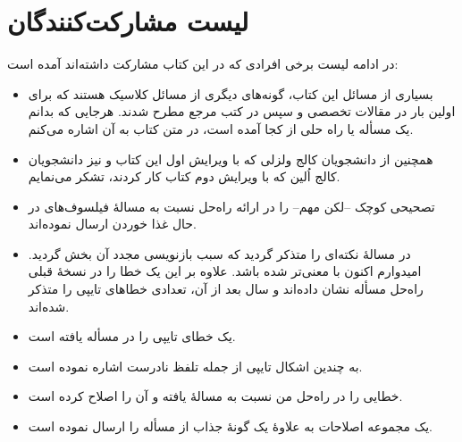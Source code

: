 \documentclass{book}
\begin{document}
\section*{لیست مشارکت‌کنندگان}

در ادامه لیست برخی افرادی که در این کتاب مشارکت داشته‌اند آمده است:

\begin{itemize}

\item    
    بسیاری از مسائل این کتاب، گونه‌های دیگری از مسائل کلاسیک هستند که برای اولین بار در مقالات تخصصی و سپس در کتب مرجع مطرح شدند. 
    هرجایی که بدانم یک مسأله یا راه حلی از کجا آمده است، در متن کتاب به آن اشاره می‌کنم.  

\item 
    همچنین از دانشجویان کالج ولزلی که با ویرایش اول این کتاب و نیز دانشجویان کالج اُلین
    که با ویرایش دوم کتاب  کار کردند، تشکر می‌نمایم. 

\item 
    تصحیحی کوچک --لکن مهم-- را در ارائه راه‌حل  نسبت به مسالهٔ فیلسوف‌های در حال غذا خوردن ارسال نموده‌اند.

\item {}
    در مسالهٔ  نکته‌ای را متذکر گردید که سبب بازنویسی مجدد آن بخش گردید. 
    امیدوارم اکنون با معنی‌تر شده باشد. 
    علاوه بر این  یک خطا را در نسخهٔ قبلی راه‌حل مسأله  نشان داده‌اند و سال بعد از آن، 
    تعدادی خطاهای تایپی را متذکر شده‌اند. 
    
\item {}
    یک خطای تایپی را در مسأله  یافته است. 

\item {}
    به چندین اشکال تایپی از جمله تلفظ نادرست  اشاره نموده است.

\item {}
    خطایی را در راه‌حل من نسبت به مسالهٔ  یافته و آن را اصلاح کرده است. 


\item {}
    یک مجموعه اصلاحات به علاوهٔ یک گونهٔ جذاب از مسأله  را ارسال نموده است. 
    
    


\end{itemize}
\end{document}
